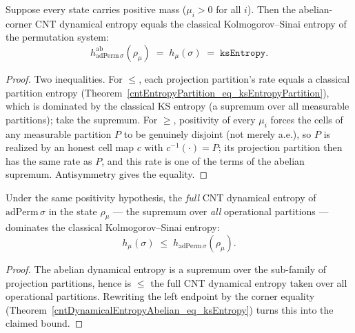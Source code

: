 \begin{theorem}[Abelian corner \(=\) Kolmogorov--Sinai entropy]\label{cntDynamicalEntropyAbelian_eq_ksEntropy}
  \leanok
  Suppose every state carries positive mass (\(\mu_i>0\) for all \(i\)). Then the abelian-corner CNT
  dynamical entropy equals the classical Kolmogorov--Sinai entropy of the permutation system:
  \[
    h^{\mathrm{ab}}_{\mathrm{adPerm}\,\sigma}(\rho_\mu)
      \;=\; h_\mu(\sigma) \;=\; \texttt{ksEntropy} .
  \]
\end{theorem}
\begin{proof}\leanok
  Two inequalities. For \(\le\), each projection partition's rate equals a classical partition
  entropy (Theorem~\ref{cntEntropyPartition_eq_ksEntropyPartition}), which is dominated by the
  classical KS entropy (a supremum over all measurable partitions); take the supremum. For \(\ge\),
  positivity of every \(\mu_i\) forces the cells of any measurable partition \(P\) to be genuinely
  disjoint (not merely a.e.), so \(P\) is realized by an honest cell map \(c\) with
  \(c^{-1}(\cdot)=P\); its projection partition then has the same rate as \(P\), and this rate is one
  of the terms of the abelian supremum. Antisymmetry gives the equality.
\end{proof}

\begin{theorem}\label{ksEntropy_le_cntDynamicalEntropy}
  \leanok
  Under the same positivity hypothesis, the \emph{full} CNT dynamical entropy of
  \(\mathrm{adPerm}\,\sigma\) in the state \(\rho_\mu\) --- the supremum over \emph{all} operational
  partitions --- dominates the classical Kolmogorov--Sinai entropy:
  \[
    h_\mu(\sigma)\;\le\; h_{\mathrm{adPerm}\,\sigma}(\rho_\mu).
  \]
\end{theorem}
\begin{proof}\leanok
  The abelian dynamical entropy is a supremum over the sub-family of projection partitions, hence is
  \(\le\) the full CNT dynamical entropy taken over all operational partitions. Rewriting the left
  endpoint by the corner equality (Theorem~\ref{cntDynamicalEntropyAbelian_eq_ksEntropy}) turns this
  into the claimed bound.
\end{proof}

